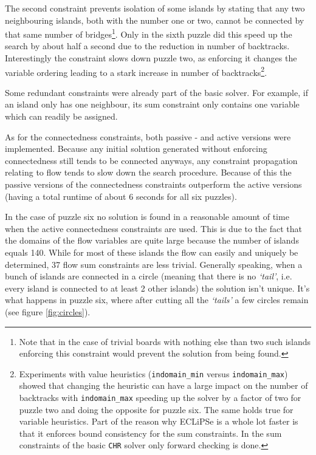 The second constraint prevents isolation of some islands by stating that any two neighbouring islands, both with the number one or two, cannot be connected by that same number of bridges\footnote{Note that in the case of trivial boards with nothing else than two such islands enforcing this constraint would prevent the solution from being found.}. Only in the sixth puzzle did this speed up the search by about half a second due to the reduction in number of backtracks. Interestingly the constraint slows down puzzle two, as enforcing it changes the variable ordering leading to a stark increase in number of backtracks\footnote{Experiments with value heuristics (\texttt{indomain\_min} versus \texttt{indomain\_max}) showed that changing the heuristic can have a large impact on the number of backtracks with \texttt{indomain\_max} speeding up the solver by a factor of two for puzzle two and doing the opposite for puzzle six. The same holds true for variable heuristics. Part of the reason why ECLiPSe is a whole lot faster is that it enforces bound consistency for the sum constraints. In the sum constraints of the basic \texttt{CHR} solver only forward checking is done.}.\\\par

Some redundant constraints were already part of the basic solver. For example, if an island only has one neighbour, its sum constraint only contains one variable which can readily be assigned.\\\par

As for the connectedness constraints, both passive - and active versions were implemented. Because any initial solution generated without enforcing connectedness still tends to be connected anyways, any constraint propagation relating to flow tends to slow down the search procedure. Because of this the passive versions of the connectedness constraints outperform the active versions (having a total runtime of about 6 seconds for all six puzzles).\\\par

In the case of puzzle six no solution is found in a reasonable amount of time when the active connectedness constraints are used. This is due to the fact that the domains of the flow variables are quite large because the number of islands equals 140. While for most of these islands the flow can easily and uniquely be determined, 37 flow sum constraints are less trivial. Generally speaking, when a bunch of islands are connected in a circle (meaning that there is no \textit{`tail'}, i.e. every island is connected to at least 2 other islands) the solution isn't unique. It's what happens in puzzle six, where after cutting all the \textit{`tails'} a few circles remain (see figure \ref{fig:circles}).

